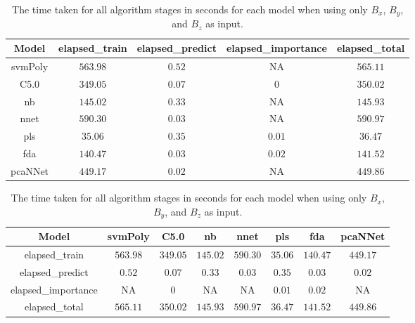 \begin{table}[!ht]
	\centering
	\begin{tabular}{|c|c|c|c|c|}
		\hline
		Model & elapsed_train & elapsed_predict & elapsed_importance & elapsed_total \\ \hline
		svmPoly & $563.98$ & $0.52$ & NA & $565.11$ \\ \hline
		C5.0 & $349.05$ & $0.07$ & $0$ & $350.02$ \\ \hline
		nb & $145.02$ & $0.33$ & NA & $145.93$ \\ \hline
		nnet & $590.30$ & $0.03$ & NA & $590.97$ \\ \hline
		pls & $35.06$ & $0.35$ & $0.01$ & $36.47$ \\ \hline
		fda & $140.47$ & $0.03$ & $0.02$ & $141.52$ \\ \hline
		pcaNNet & $449.17$ & $0.02$ & NA & $449.86$ \\ \hline
	\end{tabular}
	\caption{The time taken for all algorithm stages in seconds for each model when using only $B_{x}$, $B_{y}$, and $B_{z}$ as input.}
	\label{tab:time:coord}
\end{table}

\begin{table}[!ht]
	\centering
	\begin{tabular}{|c|c|c|c|c|c|c|c|}
		\hline
		Model & svmPoly & C5.0 & nb & nnet & pls & fda & pcaNNet \\ \hline
		elapsed_train & $563.98$ & $349.05$ & $145.02$ & $590.30$ & $35.06$ & $140.47$ & $449.17$ \\ \hline
		elapsed_predict & $0.52$ & $0.07$ & $0.33$ & $0.03$ & $0.35$ & $0.03$ & $0.02$ \\ \hline
		elapsed_importance & NA & $0$ & NA & NA & $0.01$ & $0.02$ & NA \\ \hline
		elapsed_total & $565.11$ & $350.02$ & $145.93$ & $590.97$ & $36.47$ & $141.52$ & $449.86$ \\ \hline
	\end{tabular}
	\caption{The time taken for all algorithm stages in seconds for each model when using only $B_{x}$, $B_{y}$, and $B_{z}$ as input.}
	\label{tab:time:reverse:coord}
\end{table}

